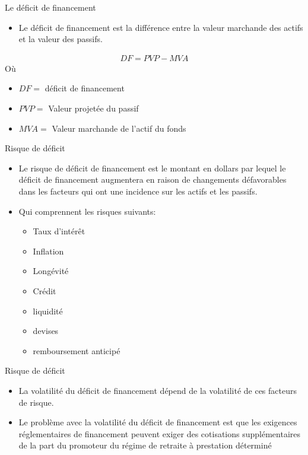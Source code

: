 \documentclass{beamer}
\begin{document}
\begin{frame}{Le déficit de financement}
\begin{itemize}[label=\bullet]
\item Le déficit de financement est la différence entre la valeur marchande des actifs et la valeur des passifs.
\end{itemize}
\begin{align*}
DF=PVP-MVA
\end{align*}
Où
\begin{itemize}[label=\bullet]
\item $DF=$ déficit de financement
\item $PVP=$ Valeur projetée du passif
\item $MVA=$ Valeur marchande de l'actif du fonds
\end{itemize}
\end{frame}

\begin{frame}{Risque de déficit}
\begin{itemize}[label=\bullet]
\item Le risque de déficit de financement est le montant en dollars par lequel le déficit de financement augmentera en raison de changements défavorables dans les facteurs qui ont une incidence sur les actifs et les passifs.
\item Qui comprennent les risques suivants:
\begin{itemize}[label=\bullet]
\item Taux d'intérêt
\item Inflation
\item Longévité
\item Crédit
\item liquidité
\item devises
\item remboursement anticipé
\end{itemize}
\end{itemize}
\end{frame}

\begin{frame}{Risque de déficit}
\begin{itemize}[label=\bullet]
\item La volatilité du déficit de financement dépend de la volatilité de ces facteurs de risque.
\item Le problème avec la volatilité du déficit de financement est que les exigences réglementaires de financement peuvent exiger des cotisations supplémentaires de la part du promoteur du régime de retraite à prestation déterminé
\end{itemize}
\end{frame}
\end{document}
